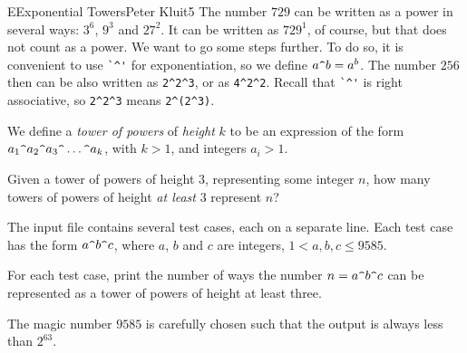 \begin{icpcproblem}{E}{Exponential Towers}{Peter Kluit}{5}
The number $729$ can be written as a power in several ways: $3^6$, $9^3$ and $27^2$. It can be written as $729^1$, of course, but that does not count as a power.
We want to go some steps further. To do so, it is convenient to use \verb|`^'| for exponentiation, so we define $a\verb|^|b = a^b$.
The number $256$ then can be also written as \verb|2^2^3|, or as \verb|4^2^2|. 
Recall that \verb|`^'| is right associative, so \verb|2^2^3| means \verb|2^(2^3)|.

We define a \emph{tower of powers} of \emph{height} $k$ to be an expression of the form $a_1\verb|^|a_2\verb|^|a_3\verb|^|\ldots \verb|^| a_k$, with $k > 1$, and integers $a_i > 1$.

Given a tower of powers of height $3$, representing some integer $n$, how many towers of powers of
height \emph{at least} $3$ represent $n$?


The input file contains several test cases, each on a separate line. Each test case has the form
$a\verb|^|b\verb|^|c$, where $a$, $b$ and $c$ are integers, $ 1 < a, b, c \leq 9585$.


For each test case, print the number of ways the number $n = a\verb|^|b\verb|^|c$ can be represented as a tower of powers of height at least three.

The magic number $9585$ is carefully chosen such that the output is always less than $2^{63}$.


\end{icpcproblem}
